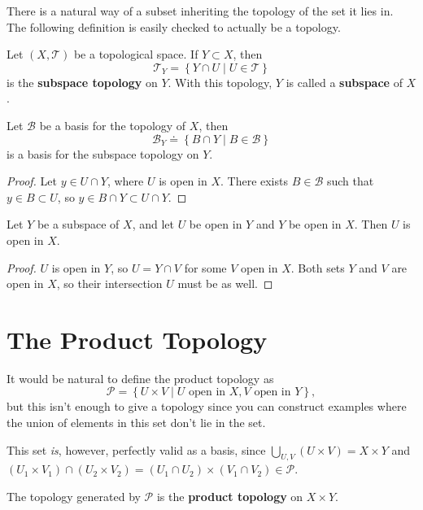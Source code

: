 \documentclass[10pt]{report}
\begin{document}
There is a natural way of a subset inheriting the topology of the set it lies in. The following definition is easily checked to actually be a topology.

\begin{defn}
	Let $(X,\mathcal{T})$ be a topological space. If $Y \subset X$, then
	\[
	\mathcal{T}_Y = \left\{ Y \cap U \;|\; U \in \mathcal{T} \right\}
	\] is the \textbf{subspace topology} on $Y$. With this topology, $Y$ is called a \textbf{subspace} of $X$.
\end{defn}

\begin{prop}
Let $\mathcal{B}$ be a basis for the topology of $X$, then \[\mathcal{B}_Y \doteq \left\{ B \cap Y \;|\; B \in \mathcal{B} \right\}\] is a basis for the subspace topology on $Y$.
\end{prop}
\begin{proof}
	Let $y \in U \cap Y$, where $U$ is open in $X$. There exists $B \in \mathcal{B}$ such that $y \in B \subset U$, so $y \in B \cap Y \subset U \cap Y$.
\end{proof}

\begin{prop}
	Let $Y$ be a subspace of $X$, and let $U$ be open in $Y$ and $Y$ be open in $X$. Then $U$ is open in $X$.
\end{prop}
\begin{proof}
	$U$ is open in $Y$, so $U=Y \cap V$ for some $V$ open in $X$. Both sets $Y$ and $V$ are open in $X$, so their intersection $U$ must be as well.
\end{proof}


\section{The Product Topology}

It would be natural to define the product topology as
\[
	\mathcal{P}= \left\{ U \times V \;|\; U \text{ open in } X, V \text{ open in } Y \right\},
\]but this isn't enough to give a topology since you can construct examples where the union of elements in this set don't lie in the set.

This set \textit{is}, however, perfectly valid as a basis, since $\bigcup_{U,V}(U\times V)=X\times Y$ and $(U_1 \times V_1) \cap (U_2 \times V_2) = (U_1 \cap U_2) \times (V_1 \cap V_2) \in \mathcal{P}$.

\begin{defn}[]
The topology generated by $\mathcal{P}$ is the \textbf{product topology} on $X \times Y$.
\end{defn}
\end{document}
